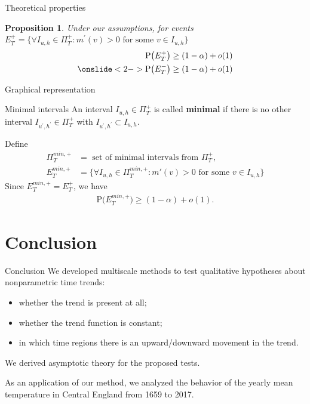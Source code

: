\documentclass[10pt]{beamer}
\newcommand{\Prob}{\mathrm{P}}
\newtheorem{prop}{Proposition}
\begin{document}
\begin{frame}{Theoretical properties}
\begin{prop}\label{prop-shape-3}
Under our assumptions, for events $E_T^+ = \Big\{ \forall I_{u,h} \in \Pi_T^+: m^{\prime}(v) > 0 \text{ for some } v \in I_{u,h}\Big\}$
\begin{align*}
\Prob \big( E_T^+ \big) \ge (1-\alpha) + o(1)\\
\onslide<2->{\Prob \big( E_T^- \big) \ge (1-\alpha) + o(1)}
\end{align*} 
\end{prop}
\end{frame}

\begin{frame}{Graphical representation}
\begin{block}{Minimal intervals}
An interval $I_{u, h} \in \Pi^+_T$ is called \textbf{minimal} if there is no other interval $I_{u^\prime, h^\prime} \in \Pi^+_T$ with $I_{u^\prime, h^\prime} \subset I_{u, h}$.
\end{block}\pause
Define
\begin{align*}
\Pi^{min, +}_T &= \text{ set of minimal intervals from }\Pi^+_T,\\
E_T^{min, +} &= \Big\{ \forall I_{u,h} \in \Pi_T^{min, +}: m'(v) > 0 \text{ for some } v \in I_{u,h}\Big\}
\end{align*}\pause
Since $E_T^{min, +} = E_T^{+}$, we have
\begin{align*}
\Prob \big( E_T^{min, +} \big) \ge (1-\alpha) + o(1).
\end{align*}
\end{frame}



\section{Conclusion}
\begin{frame}{Conclusion}
We developed multiscale methods to test qualitative hypotheses about nonparametric time trends:
\begin{itemize}
\item whether the trend is present at all;
\item whether the trend function is constant;
\item in which time regions there is an upward/downward movement in the trend.
\end{itemize}
We derived asymptotic theory for the proposed tests.

As an application of our method, we analyzed the behavior of the yearly mean temperature in Central England from 1659 to 2017.
\end{frame}
\end{document}

